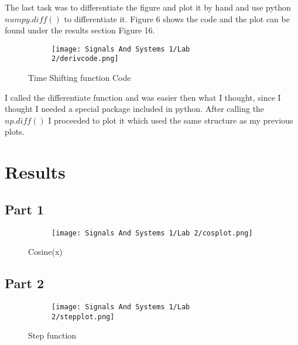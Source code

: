 \documentclass[12pt,a4paper]{article}
\begin{document}
\noindent The last task was to differentiate the figure and plot it by hand and use python $numpy.diff()$ to differentiate it. Figure 6 shows the code and the plot can be found under the results section Figure 16.


\begin{figure}[h]
\begin{subfigure}{ 1\textwidth}
\texttt{[image: Signals And Systems 1/Lab 2/derivcode.png]}
\end{subfigure}
\caption{Time Shifting function Code}
\label{fig:image2}
\end{figure}

\noindent I called the differentiate function and was easier then what I thought, since I thought I needed a special package included in python. After calling the $np.diff()$ I proceeded to plot it which used the same structure as my previous plots.
\newpage


\section{Results}\label{sec:res}

\subsection{Part 1}

\begin{figure}[h]
\centering
\begin{subfigure}{ 1\textwidth}
\texttt{[image: Signals And Systems 1/Lab 2/cosplot.png]}
\end{subfigure}
\caption{ Cosine(x)}
\label{fig2:image22}
\end{figure}



\subsection{Part 2}

\begin{figure}[h]
\centering
\begin{subfigure}{ 1\textwidth}
\texttt{[image: Signals And Systems 1/Lab 2/stepplot.png]}
\end{subfigure}
\caption{ Step function}
\label{fig2:image22}
\end{figure}


\newpage
\end{document}
